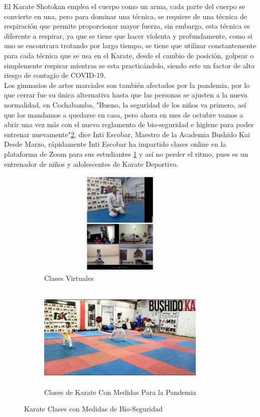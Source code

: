 El Karate Shotokan emplea el cuerpo como un arma, cada parte del cuerpo se convierte en una, pero para dominar una técnica, se requiere de una técnica de respiración que permite proporcionar mayor fuerza, sin embargo, esta técnica es diferente a respirar, ya que se tiene que hacer violenta y profundamente, como si uno se encontrara trotando por largo tiempo, se tiene que utilizar constantemente para cada técnica que se usa en el Karate, desde el cambio de posición, golpear o simplemente respirar mientras se esta practicándolo, siendo este un factor de alto riesgo de contagio de COVID-19. \\
Los gimnasios de artes marciales son también afectados por la pandemia, por lo que cerrar fue su única alternativa hasta que las personas se ajusten a la nueva normalidad, en Cochabamba, "Bueno, la seguridad de los niños va primero, así que los mandamos a quedarse en casa, pero ahora en mes de octubre vamos a abrir una vez más con el nuevo reglamento de bio-seguridad e higiene para poder entrenar nuevamente"\ref{claseenPandemia}, dice Inti Escobar, Maestro de la Academia Bushido Kai  Desde Marzo, rápidamente Inti Escobar ha impartido clases online en la plataforma de Zoom para sus estudiantes \ref{clasevirtual} y así no perder el ritmo, pues es un entrenador de niños y adolescentes de Karate Deportivo.

\begin{figure}
	\centering
\begin{subfigure}{.5\textwidth}
	\centering
	\includegraphics[width=8cm,height=5cm]{./Images/ClaseVirtual.jpg}
	\caption{Clases Virtuales}
	\label{clasevirtual}
\end{subfigure}%
\begin{subfigure}{.5\textwidth}
	\centering
	\includegraphics[width=8cm,height=5cm]{./Images/ClaseEnPandemia.jpg}
	\caption{Clases de Karate Con Medidas Para la Pandemia}
	\label{claseenPandemia}
\end{subfigure}
\caption{Karate Clases con Medidas de Bio-Seguridad}
\label{karateclass}
\end{figure}


